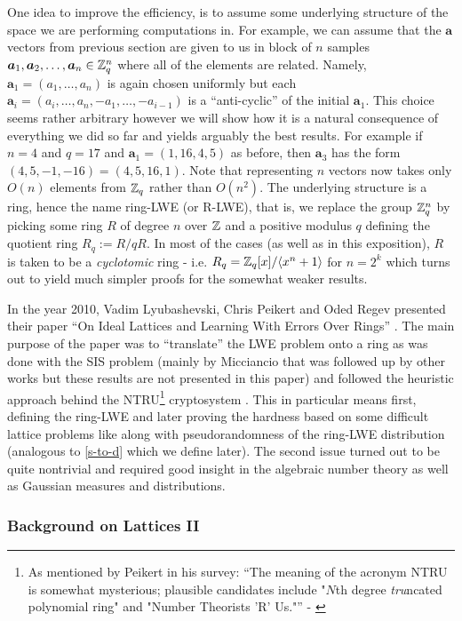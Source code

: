 One idea to improve the efficiency, is to assume some underlying structure of the space we are performing computations in. For example, we can assume that the $\bm{a}$ vectors from previous section are given to us in block of $n$ samples $\boldsymbol{a}_1, \boldsymbol{a}_2, \dots, \boldsymbol{a}_n \in \mathbb{Z}_q^n$ where all of the elements are related. Namely, $\bm{a}_1 = (a_1, \dots, a_n)$ is again chosen uniformly but each $\bm{a}_i = (a_i, \dots, a_n, -a_1, \dots, -a_{i - 1})$ is a ``anti-cyclic'' of the initial $\bm{a}_1$. This choice seems rather arbitrary however we will show how it is a natural consequence of everything we did so far and yields arguably the best results. For example if $n = 4$ and $q = 17$ and $\bm{a}_1 = (1, 16, 4, 5)$ as before, then $\bm{a}_3$ has the form $(4, 5, -1, -16) = (4, 5, 16, 1)$. Note that representing $n$ vectors now takes only $O(n)$ elements from $\mathbb{Z}_q$ rather than $O(n^2)$. The underlying structure is a ring, hence the name ring-LWE (or R-LWE), that is, we replace the group $\mathbb{Z}_q^n$ by picking some ring $R$ of degree $n$ over $\mathbb{Z}$ and a positive modulus $q$ defining the quotient ring $R_q := R/qR$. In most of the cases (as well as in this exposition), $R$ is taken to be a \textit{cyclotomic} ring - i.e. $R_q = \mathbb{Z}_q[x]/\langle x^n + 1 \rangle$ for $n = 2^k$ which turns out to yield much simpler proofs for the somewhat weaker results.

In the year 2010, Vadim Lyubashevski, Chris Peikert and Oded Regev presented their paper ``On Ideal Lattices and Learning With Errors Over Rings'' \cite{ring-lwe}. The main purpose of the paper was to ``translate'' the LWE problem onto a ring as was done with the SIS problem (mainly by Micciancio \cite{ring-sis} that was followed up by other works but these results are not presented in this paper) and followed the heuristic approach behind the NTRU\footnote{As mentioned by Peikert in his survey: ``The meaning of the acronym NTRU is somewhat mysterious; plausible candidates include "$N$th degree \textit{tru}ncated polynomial ring" and "Number Theorists ’R’ Us."'' - \cite{lattice-survey}} cryptosystem \cite{ntru}. This in particular means first, defining the ring-LWE and later proving the hardness based on some difficult lattice problems like  along with pseudorandomness of the ring-LWE distribution (analogous to \ref{s-to-d} which we define later). The second issue turned out to be quite nontrivial and required good insight in the algebraic number theory as well as Gaussian measures and distributions.

\subsubsection{Background on Lattices II}
